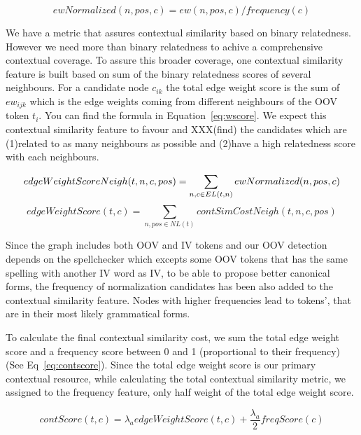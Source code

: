 \documentclass[preprint,review,12pt]{elsarticle}
\begin{document}
\begin{equation}
ewNormalized(n,pos,c) = ew(n,pos,c) / frequency(c)
\label{eq:ew_norm}
\end{equation}


We have a metric that assures contextual similarity based on binary relatedness. However we need more than binary relatedness to achive a comprehensive contextual coverage. To assure this broader coverage, one contextual similarity feature is built based on sum of the binary relatedness scores of several neighbours. For a candidate node $c_{ik}$ the total edge weight score is the sum of $ew_{ijk}$ which is the edge weights coming from different neighbours of the OOV token $t_i$. You can find the formula in Equation~\ref{eq:wscore}. We expect this contextual similarity feature to favour and XXX(find) the candidates which are (1)related to as many neighbours as possible and (2)have a high relatedness score with each neighbours.

\begin{equation}
edgeWeightScoreNeigh(t,n,c,pos) = \sum_{n,c \in EL(t,n)}{ewNormalized(n,pos,c)} \\\\
\end{equation}
\begin{equation}
edgeWeightScore(t,c) = \sum_{n,pos \in NL(t) }{contSimCostNeigh(t,n,c,pos)}
\label{eq:wscore}
\end{equation}

Since the graph includes both OOV and IV tokens and our OOV detection depends on the spellchecker which excepts some OOV tokens that has the same spelling with another IV word as IV, to be able to propose better canonical forms, the frequency of normalization candidates has been also added to the contextual similarity feature. Nodes with higher frequencies lead to tokens', that are in their most likely grammatical forms.

To calculate the final contextual similarity cost, we sum the total edge weight score and a frequency score between 0 and 1 (proportional to their frequency) (See Eq~\ref{eq:contscore}). Since the total edge weight score is our primary contextual resource, while calculating the total contextual similarity metric, we assigned to the frequency feature, only half weight of the total edge weight score.

\begin{equation}
contScore(t,c) = \lambda_a edgeWeightScore(t,c) + \frac{\lambda_a} 2 freqScore(c)
\label{eq:contscore}
\end{equation}
\end{document}
